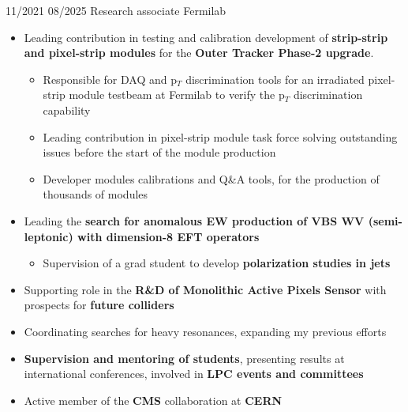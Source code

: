    
  \position
  {11/2021  \textemdash{} 08/2025} 
   {Research associate}
   {Fermilab}
{\begin{itemize}

\item Leading contribution in testing and calibration development of {\bf strip-strip and pixel-strip modules} for the {\bf Outer Tracker Phase-2 upgrade}.
\begin{itemize}
\item Responsible for DAQ and p$_{T}$ discrimination tools for an irradiated pixel-strip module testbeam at Fermilab to verify the p$_{T}$ discrimination capability
\item Leading contribution in pixel-strip module task force solving outstanding issues before the start of the module production
\item Developer modules calibrations and Q\&A tools, for the production of thousands of modules
\end{itemize}
\item Leading the {\bf search for anomalous EW production of VBS WV (semi-leptonic) with dimension-8 EFT operators}
\begin{itemize}
\item Supervision of a grad student to develop {\bf polarization studies in jets} %
\end{itemize}
\item Supporting role in the {\bf R\&D of Monolithic Active Pixels Sensor} with prospects for {\bf future colliders}
\item Coordinating searches for heavy resonances, expanding my previous efforts
\item {\bf Supervision and mentoring of students}, presenting results at international conferences,  involved in {\bf LPC events and committees}
\item Active member of the {\bf CMS} collaboration at {\bf CERN}

\end{itemize}
}

